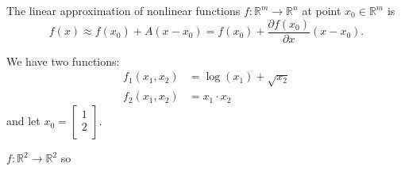 The linear approximation of nonlinear functions \(f: \mathbb{R}^m \to \mathbb{R}^n\) at point \(x_0 \in \mathbb{R}^m\) is
\[
  f(x) \approx f(x_0) + A(x - x_0) = f(x_0) + \frac{\partial f(x_0)}{\partial x} (x - x_0).
\]

\begin{problem}
  We have two functions:
  \begin{align*}
    f_1(x_1, x_2) &= \log (x_1) + \sqrt{x_2} \\
    f_2(x_1, x_2) &= x_1 \cdot x_2
  \end{align*}
  and let \(x_0 =
  \begin{bmatrix}
    1 \\
    2 \\  
  \end{bmatrix}\). 
\end{problem}
\begin{answer}
  \(f: \mathbb{R}^2 \to \mathbb{R}^2\) so 
\end{answer}
